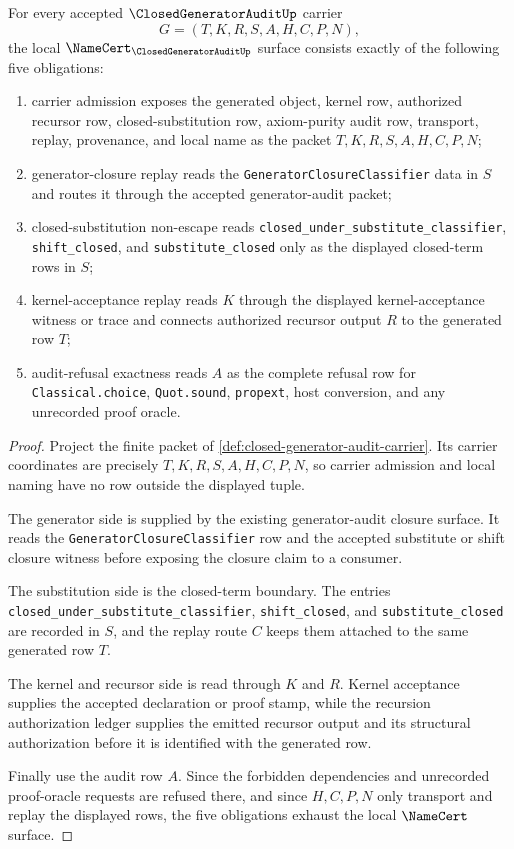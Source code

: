 \begin{theorem}
\label{thm:closed-generator-audit-namecert-obligations}
For every accepted $\ClosedGeneratorAuditUp$ carrier
$$
G=(T,K,R,S,A,H,C,P,N),
$$
the local $\NameCert_{\ClosedGeneratorAuditUp}$ surface consists exactly of the following five obligations:
\begin{enumerate}
\item carrier admission exposes the generated object, kernel row, authorized recursor row, closed-substitution row, axiom-purity audit row, transport, replay, provenance, and local name as the packet $T,K,R,S,A,H,C,P,N$;
\item generator-closure replay reads the \texttt{GeneratorClosureClassifier} data in $S$ and routes it through the accepted generator-audit packet;
\item closed-substitution non-escape reads \texttt{closed\_under\_substitute\_classifier}, \texttt{shift\_closed}, and \texttt{substitute\_closed} only as the displayed closed-term rows in $S$;
\item kernel-acceptance replay reads $K$ through the displayed kernel-acceptance witness or trace and connects authorized recursor output $R$ to the generated row $T$;
\item audit-refusal exactness reads $A$ as the complete refusal row for \texttt{Classical.choice}, \texttt{Quot.sound}, \texttt{propext}, host conversion, and any unrecorded proof oracle.
\end{enumerate}
\end{theorem}
\begin{proof}
Project the finite packet of \autoref{def:closed-generator-audit-carrier}. Its carrier coordinates are precisely $T,K,R,S,A,H,C,P,N$, so carrier admission and local naming have no row outside the displayed tuple.

The generator side is supplied by the existing generator-audit closure surface. It reads the \texttt{GeneratorClosureClassifier} row and the accepted substitute or shift closure witness before exposing the closure claim to a consumer.

The substitution side is the closed-term boundary. The entries \texttt{closed\_under\_substitute\_classifier}, \texttt{shift\_closed}, and \texttt{substitute\_closed} are recorded in $S$, and the replay route $C$ keeps them attached to the same generated row $T$.

The kernel and recursor side is read through $K$ and $R$. Kernel acceptance supplies the accepted declaration or proof stamp, while the recursion authorization ledger supplies the emitted recursor output and its structural authorization before it is identified with the generated row.

Finally use the audit row $A$. Since the forbidden dependencies and unrecorded proof-oracle requests are refused there, and since $H,C,P,N$ only transport and replay the displayed rows, the five obligations exhaust the local $\NameCert$ surface.
\end{proof}

